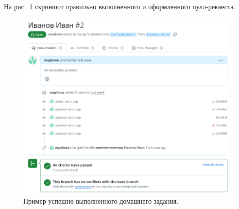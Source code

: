\documentclass[14pt]{extarticle}
\begin{document}
    На рис.~\ref{fig:pr} скриншот правильно выполненного и оформленного пулл-реквеста.

    \begin{figure}[ht]
        \centering
        \includegraphics[width=\textwidth]{Homeworks/2-Git/pull-request.png}
        \caption{Пример успешно выполненного домашнего задания.}
        \label{fig:pr}
    \end{figure}

\clearpage
\end{document}
